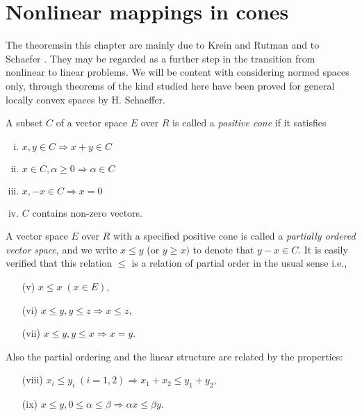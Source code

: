 \chapter{Nonlinear mappings in cones}\label{chap4}
 
The theorems\pageoriginale in this chapter are mainly due to Krein and
Rutman \cite{key20} 
and to Schaefer \cite{key28}. They may be regarded as a further step in the
transition from nonlinear to linear problems. We will be content with
considering normed spaces only, through theorems of the kind studied
here have been proved for general locally convex spaces by
H. Schaeffer. 
 
 \begin{Definition}%
   A subset $C$ of a vector space $E$ over $R$ is called a {\em
     positive cone} if it satisfies   
   \begin{enumerate}[(i)]
   \item $x, y \in C \Rightarrow x + y \in C$
   \item $x \in C, \alpha \geq 0 \Rightarrow \alpha \in C$
   \item $x, -x \in C \Rightarrow x=0 $
   \item $C$ contains non-zero vectors.
   \end{enumerate}
 \end{Definition} 
 
 A vector space $E$ over $R$ with a specified positive cone is called
 a {\em partially ordered vector space}, and we write $x \leq y$
(or $y \geq x)$ to denote that $y-x \in C$. It is easily
 verified that this relation $\leq$ is a relation of partial order in
 the usual sense i.e., 
\begin{enumerate}
\item[(v)] $x \leq x \; (x \in E)$,
\item [(vi)] $x \leq y, y \leq z \Rightarrow x \leq z$,
\item [(vii)] $x \leq y, y \leq x \Rightarrow x = y $.
\end{enumerate}
Also the partial ordering and the linear structure are related by the 
properties:\pageoriginale
\begin{itemize}
\item[(viii)]
 $x_i \leq y_i \; (i=1,2) \Rightarrow x_1 + x_2 \leq y_1 + y_2$,

\item[(ix)] $x \leq y, 0 \leq \alpha \leq \beta \Rightarrow \alpha x \leq
\beta y$. 
\end{itemize}

